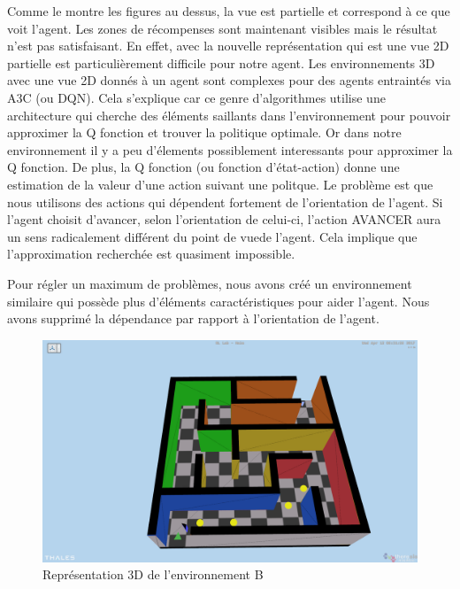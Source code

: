 Comme le montre les figures au dessus, la vue est partielle et correspond à ce que voit l'agent. Les zones de récompenses sont maintenant visibles mais le résultat n'est pas satisfaisant. En effet, avec la nouvelle représentation qui est une vue 2D partielle est particulièrement difficile pour notre agent. Les environnements 3D avec une vue 2D donnés à un agent sont complexes pour des agents entraintés via A3C (ou DQN). Cela s'explique car ce genre d'algorithmes utilise une architecture qui cherche des éléments saillants dans l'environnement pour pouvoir approximer la Q fonction et trouver la politique optimale. Or dans notre environnement il y a peu d'élements possiblement interessants pour approximer la Q fonction. De plus, la Q fonction (ou fonction d'état-action) donne une estimation de la valeur d'une action suivant une politque. Le problème est que nous utilisons des actions qui dépendent fortement de l'orientation de l'agent. Si l'agent choisit d'avancer, selon l'orientation de celui-ci, l'action AVANCER aura un sens radicalement différent du point de vuede l'agent. Cela implique que l'approximation recherchée est quasiment impossible.


Pour régler un maximum de problèmes, nous avons créé  un environnement similaire qui possède plus d'éléments caractéristiques  pour aider l'agent. Nous avons supprimé la dépendance par rapport à l'orientation de l'agent. 


\begin{figure}[h!]
    \begin{center}
        \includegraphics[scale=.15]{./assets/SESTAR/env_sestar_color.png}
\caption{Représentation 3D de l'environnement B}
\end{center}
\end{figure}

